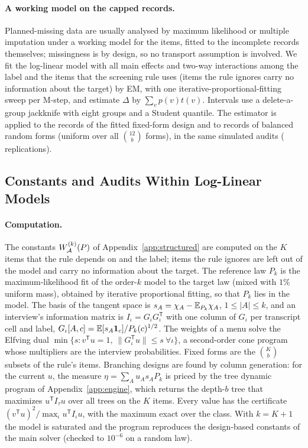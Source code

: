 \paragraph{A working model on the capped records.}
Planned-missing data are usually analysed by maximum likelihood or multiple imputation under a working model for the items, fitted to the incomplete records themselves; missingness is by design, so no transport assumption is involved. We fit the log-linear model with all main effects and two-way interactions among the label and the items that the screening rule uses (items the rule ignores carry no information about the target) by EM, with one iterative-proportional-fitting sweep per M-step, and estimate $\Delta$ by $\sum_vp(v)t(v)$. Intervals use a delete-a-group jackknife with eight groups and a Student quantile. The estimator is applied to the records of the fitted fixed-form design and to records of balanced random forms (uniform over all $\binom{12}b$ forms), in the same simulated audits (\nEmReps{} replications).

\nEmAppendixText

\subsection{Constants and Audits Within Log-Linear Models}\label{app:modelexp}
\paragraph{Computation.}
The constants $W^{(k)}_\mathcal A(P)$ of Appendix~\ref{app:structured} are computed on the $K$ items that the rule depends on and the label; items the rule ignores are left out of the model and carry no information about the target. The reference law $P_k$ is the maximum-likelihood fit of the order-$k$ model to the target law (mixed with $1\%$ uniform mass), obtained by iterative proportional fitting, so that $P_k$ lies in the model. The basis of the tangent space is $s_A=\chi_A-\mathbb{E}_{P_k}\chi_A$, $1\le|A|\le k$, and an interview's information matrix is $I_\iota=G_\iota G_\iota^{\mathsf T}$ with one column of $G_\iota$ per transcript cell and label, $G_\iota[A,c]=\mathbb{E}[s_A\mathbf 1_c]/P_k(c)^{1/2}$. The weights of a menu solve the Elfving dual $\min\{s:v^{\mathsf T}u=1,\ \|G_\iota^{\mathsf T}u\|\le s\ \forall\iota\}$, a second-order cone program whose multipliers are the interview probabilities. Fixed forms are the $\binom Kb$ subsets of the rule's items. Branching designs are found by column generation: for the current $u$, the measure $\eta=\sum_Au_As_AP_k$ is priced by the tree dynamic program of Appendix~\ref{app:engine}, which returns the depth-$b$ tree that maximizes $u^{\mathsf T}I_\tau u$ over all trees on the $K$ items. Every value has the certificate $(v^{\mathsf T}u)^2/\max_\iota u^{\mathsf T}I_\iota u$, with the maximum exact over the class. With $k=K+1$ the model is saturated and the program reproduces the design-based constants of the main solver (checked to $10^{-6}$ on a random law).

